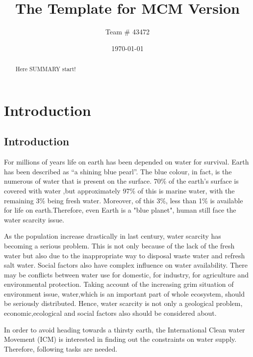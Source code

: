 \documentclass{mcmthesis}
\title{The Template for MCM Version }
\author{Team \# 43472}
\date{\today}
\begin{document}
\begin{abstract}
Here SUMMARY start!

\end{abstract}

\maketitle

\tableofcontents

\newpage

\section{Introduction}
\subsection{Introduction}

	
	 For millions of years life on earth has been depended on water for survival. Earth has been described as “a shining blue pearl”. The blue colour, in fact, is the numerous of water that is present on the surface. 70\% of the earth’s surface is covered with water ,but approximately 97\% of this is marine water, with the remaining 3\% being fresh water. Moreover, of this 3\%, less than 1\% is available for life on earth.Therefore, even Earth is a "blue planet", human still face the water scarcity issue.
	 
	As the population increase drastically in last century, water scarcity has becoming a serious problem. This is not only because of the lack of the fresh water but also due to the inappropriate way to disposal waste water and refresh salt water. Social factors also have complex influence on water availability. There may be conflicts between water use for domestic, for industry, for agriculture and environmental protection. Taking account of the increasing grim situation of 
environment issue, water,which is an important part of whole ecosystem, should be seriously distributed. Hence, water scarcity is not only a geological problem, economic,ecological and social factors also should be considered about. 
	
	In order to avoid heading towards a thirsty earth, the International Clean water Movement (ICM) is interested in finding out the constraints on water supply. Therefore, following tasks are needed.
\end{document}
